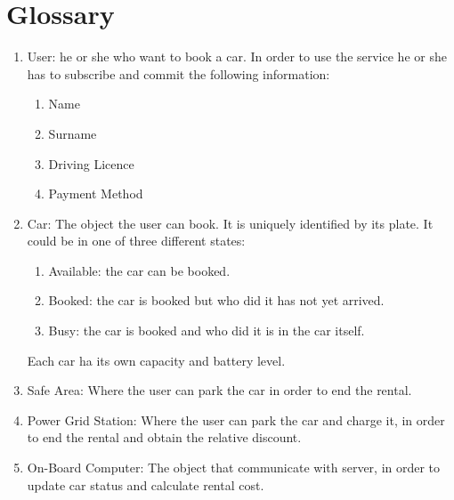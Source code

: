 \section{Glossary}
\begin{enumerate}
	\item User: he or she who want to book a car. In order to use the service he or she has to subscribe and commit the following information:
	\begin{enumerate}
	\item Name
	\item Surname
	\item Driving Licence
	\item Payment Method
	\end{enumerate}
	\item Car: The object the user can book. It is uniquely identified by its plate. It could be in one of three different states:
	\begin{enumerate}
	\item Available: the car can be booked.
	\item Booked: the car is booked but who did it has not yet arrived.
	\item Busy: the car is booked and who did it is in the car itself.
	\end{enumerate}
	Each car ha its own capacity and battery level.
	\item Safe Area: Where the user can park the car in order to end the rental.
	\item Power Grid Station: Where the user can park the car and charge it, in order to end the rental and obtain the relative discount.
	\item On-Board Computer: The object that communicate with server, in order to update car status and calculate rental cost.
	
	
\end{enumerate}